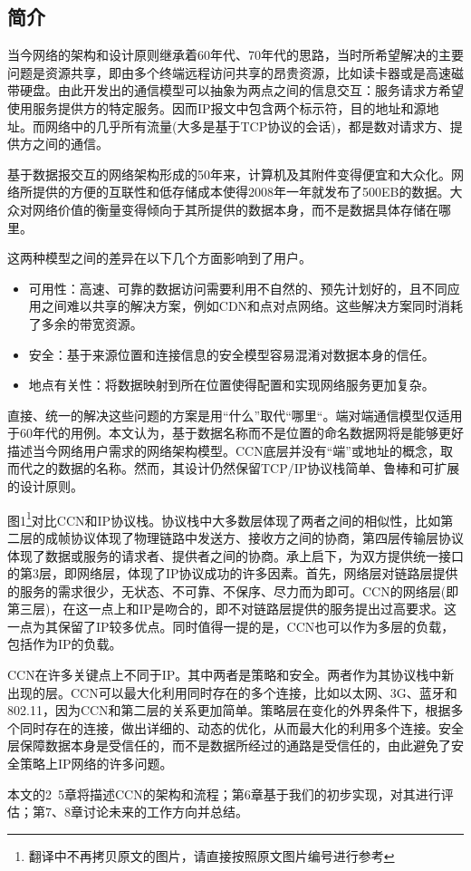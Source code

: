 \subsection*{简介}
当今网络的架构和设计原则继承着60年代、70年代的思路，当时所希望解决的主要问题是资源共享，即由多个终端远程访问共享的昂贵资源，比如读卡器或是高速磁带硬盘。由此开发出的通信模型可以抽象为两点之间的信息交互：服务请求方希望使用服务提供方的特定服务。因而IP报文中包含两个标示符，目的地址和源地址。而网络中的几乎所有流量(大多是基于TCP协议的会话)，都是数对请求方、提供方之间的通信。
\par
基于数据报交互的网络架构形成的50年来，计算机及其附件变得便宜和大众化。网络所提供的方便的互联性和低存储成本使得2008年一年就发布了500EB的数据。大众对网络价值的衡量变得倾向于其所提供的数据本身，而不是数据具体存储在哪里。
\par
这两种模型之间的差异在以下几个方面影响到了用户。
\begin{itemize}
\item
可用性：高速、可靠的数据访问需要利用不自然的、预先计划好的，且不同应用之间难以共享的解决方案，例如CDN和点对点网络。这些解决方案同时消耗了多余的带宽资源。
\item
安全：基于来源位置和连接信息的安全模型容易混淆对数据本身的信任。
\item
地点有关性：将数据映射到所在位置使得配置和实现网络服务更加复杂。
\end{itemize}
\par
直接、统一的解决这些问题的方案是用“什么”取代“哪里“。端对端通信模型仅适用于60年代的用例。本文认为，基于数据名称而不是位置的命名数据网将是能够更好描述当今网络用户需求的网络架构模型。CCN底层并没有“端”或地址的概念，取而代之的数据的名称。然而，其设计仍然保留TCP/IP协议栈简单、鲁棒和可扩展的设计原则。
\par
图1\footnote{翻译中不再拷贝原文的图片，请直接按照原文图片编号进行参考}对比CCN和IP协议栈。协议栈中大多数层体现了两者之间的相似性，比如第二层的成帧协议体现了物理链路中发送方、接收方之间的协商，第四层传输层协议体现了数据或服务的请求者、提供者之间的协商。承上启下，为双方提供统一接口的第3层，即网络层，体现了IP协议成功的许多因素。首先，网络层对链路层提供的服务的需求很少，无状态、不可靠、不保序、尽力而为即可。CCN的网络层(即第三层)，在这一点上和IP是吻合的，即不对链路层提供的服务提出过高要求。这一点为其保留了IP较多优点。同时值得一提的是，CCN也可以作为多层的负载，包括作为IP的负载。
\par
CCN在许多关键点上不同于IP。其中两者是策略和安全。两者作为其协议栈中新出现的层。CCN可以最大化利用同时存在的多个连接，比如以太网、3G、蓝牙和802.11，因为CCN和第二层的关系更加简单。策略层在变化的外界条件下，根据多个同时存在的连接，做出详细的、动态的优化，从而最大化的利用多个连接。安全层保障数据本身是受信任的，而不是数据所经过的通路是受信任的，由此避免了安全策略上IP网络的许多问题。
\par
本文的2~5章将描述CCN的架构和流程；第6章基于我们的初步实现，对其进行评估；第7、8章讨论未来的工作方向并总结。
\par
